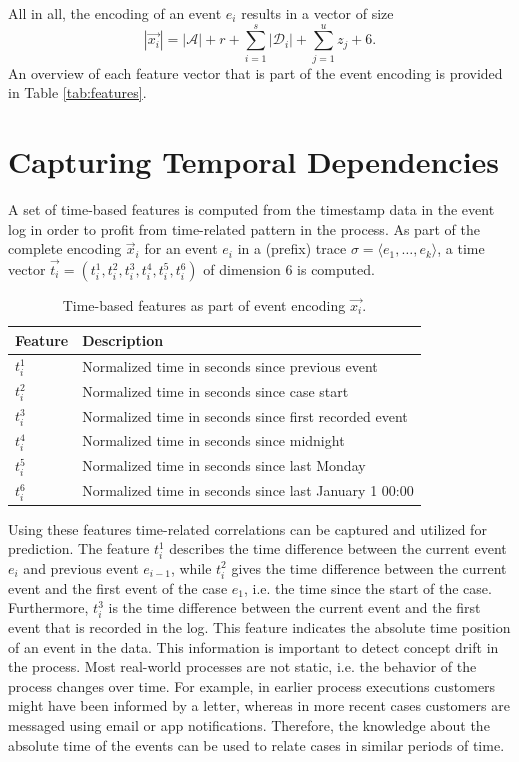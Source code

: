 All in all, the encoding of an event $e_i$ results in a vector of size
\begin{equation*}
|\vec{x_i}|= |\mathcal{A}| + r + \sum_{i=1}^{s} |\mathcal{D}_i| + \sum_{j=1}^{u} z_j + 6.
\end{equation*}
An overview of each feature vector that is part of the event encoding is provided in Table \ref{tab:features}.

\section{Capturing Temporal Dependencies}\label{sec:time}

A set of time-based features is computed from the timestamp data in the event log in order to profit from time-related pattern in the process.
As part of the complete encoding $\vec{x}_i$ for an event $e_i$ in a (prefix) trace $\sigma = \langle e_1, \dots, e_k \rangle$, a time vector $\vec{t_i} = (t_i^1, t_i^2,t_i^3,t_i^4,t_i^5,t_i^6)$ of dimension 6 is computed.

\begin{table}[!htbp]
	\centering
	\begin{tabularx}{0.8\textwidth}{l l}
		\toprule
		 \textbf{Feature} & \textbf{Description} \\
		 \midrule
		$t_i^1$ & Normalized time in seconds since previous event \\
		$t_i^2$ & Normalized time in seconds since case start \\
		$t_i^3$ & Normalized time in seconds since first recorded event \\
		$t_i^4$ & Normalized time in seconds since midnight \\
		$t_i^5$ & Normalized time in seconds since last Monday \\
		$t_i^6$ & Normalized time in seconds since last January 1 00:00 \\
		\bottomrule
	\end{tabularx}
	\caption[Time-based features as part of the event encoding]{Time-based features as part of event encoding $\vec{x_i}$.}
	\label{tab:time-features}
\end{table}

Using these features time-related correlations can be captured and utilized for prediction.
The feature $t_i^1$ describes the time difference between the current event $e_i$ and previous event $e_{i-1}$, while $t_i^2$ gives the time difference between the current event and the first event of the case $e_1$, i.e. the time since the start of the case.
Furthermore, $t_i^3$ is the time difference between the current event and the first event that is recorded in the log. This feature indicates the absolute time position of an event in the data.
This information is important to detect concept drift \cite{DBLP:journals/tnn/BoseAZP14} in the process.
Most real-world processes are not static, i.e. the behavior of the process changes over time.
For example, in earlier process executions customers might have been informed by a letter, whereas in more recent cases customers are messaged using email or app notifications.
Therefore, the knowledge about the absolute time of the events can be used to relate cases in similar periods of time.

